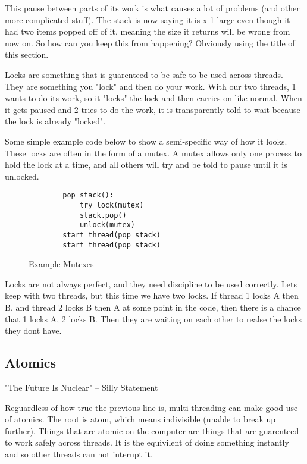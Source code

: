 \documentclass[12pt]{article}
\begin{document}
This pause between parts of its work is what causes a lot of problems (and other more complicated stuff).
The stack is now saying it is x-1 large even though it had two items popped off of it, meaning the size it returns will be wrong from now on.
So how can you keep this from happening?
Obviously using the title of this section.

Locks are something that is guarenteed to be safe to be used across threads.
They are something you "lock" and then do your work.
With our two threads, 1 wants to do its work, so it "locks" the lock and then carries on like normal.
When it gets paused and 2 tries to do the work, it is transparently told to wait because the lock is already "locked".

Some simple example code below to show a semi-specific way of how it looks.
These locks are often in the form of a mutex.
A mutex allows only one process to hold the lock at a time, and all others will try and be told to pause until it is unlocked.

\begin{figure}[htb]
	\centering
	\begin{minipage}{0.4\textwidth}
	\begin{verbatim}
		pop_stack():
			try_lock(mutex)
			stack.pop()
			unlock(mutex)
		start_thread(pop_stack)
		start_thread(pop_stack)
	\end{verbatim}
	\end{minipage}
	\caption{Example Mutexes}
\end{figure}

Locks are not always perfect, and they need discipline to be used correctly.
Lets keep with two threads, but this time we have two locks.
If thread 1 locks A then B, and thread 2 locks B then A at some point in the code, then there is a chance that 1 locks A, 2 locks B.
Then they are waiting on each other to realse the locks they dont have.

\subsection{Atomics}

"The Future Is Nuclear"  -- Silly Statement

Reguardless of how true the previous line is, multi-threading can make good use of atomics.
The root is atom, which means indivisible (unable to break up further).
Things that are atomic on the computer are things that are guarenteed to work safely across threads.
It is the equivilent of doing something instantly and so other threads can not interupt it.
\end{document}
